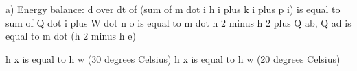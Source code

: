 a) Energy balance: 
d over dt of (sum of m dot i h i plus k i plus p i) is equal to sum of Q dot i plus W dot n  
o is equal to m dot h 2 minus h 2 plus Q ab, Q ad is equal to m dot (h 2 minus h e)

h x is equal to h w (30 degrees Celsius)
h x is equal to h w (20 degrees Celsius)